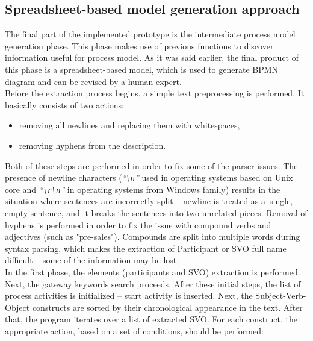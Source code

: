 \subsection{Spreadsheet-based model generation approach}
The final part of the implemented prototype is the intermediate process model generation phase. This phase makes use of previous functions to discover information useful for process model. As it was said earlier, the final product of this phase is a spreadsheet-based model, which is used to generate BPMN diagram and can be revised by a human expert.\\
Before the extraction process begins, a simple text preprocessing is performed. It basically consists of two actions:
\begin{itemize}
	\item removing all newlines and replacing them with whitespaces,
	\item removing hyphens from the description.
\end{itemize}
Both of these steps are performed in order to fix some of the parser issues. The presence of newline characters (\emph{``\texttt{\textbackslash n}''} used in operating systems based on Unix core and \emph{``\texttt{\textbackslash r\textbackslash n}''} in operating systems from Windows family) results in the situation where sentences are incorrectly split -- newline is treated as a~single, empty sentence, and it breaks the sentences into two unrelated pieces. Removal of hyphens is performed in order to fix the issue with compound verbs and adjectives (such as "pre-sales"). Compounds are split into multiple words during syntax parsing, which makes the extraction of Participant or SVO full name difficult -- some of the information may be lost.\\
In the first phase, the elements (participants and SVO) extraction is performed. Next, the gateway keywords search proceeds. After these initial steps, the list of process activities is initialized -- start activity is inserted. Next, the Subject-Verb-Object constructs are sorted by their chronological appearance in the text. After that, the program iterates over a list of extracted SVO. For each construct, the appropriate action, based on a set of conditions, should be performed:
